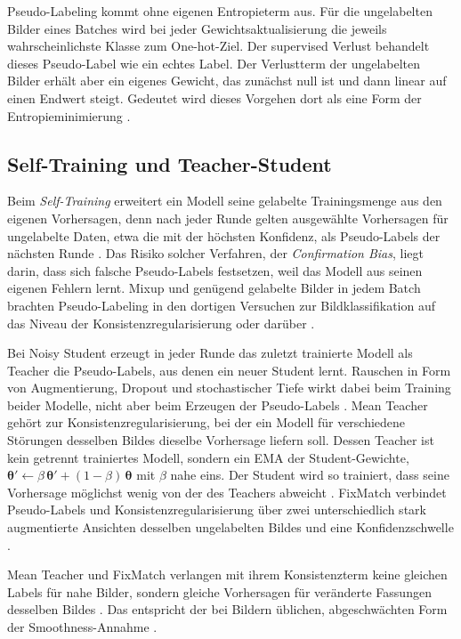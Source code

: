 Pseudo-Labeling kommt ohne eigenen Entropieterm aus. Für die ungelabelten Bilder eines Batches wird bei jeder Gewichtsaktualisierung die jeweils wahrscheinlichste Klasse zum One-hot-Ziel. Der supervised Verlust behandelt dieses Pseudo-Label wie ein echtes Label. Der Verlustterm der ungelabelten Bilder erhält aber ein eigenes Gewicht, das zunächst null ist und dann linear auf einen Endwert steigt. Gedeutet wird dieses Vorgehen dort als eine Form der Entropieminimierung \cite{lee_pseudo-label_2013}.

\subsection{Self-Training und Teacher-Student}
\label{sec:teacher-student}

Beim \emph{Self-Training} erweitert ein Modell seine gelabelte Trainingsmenge aus den eigenen Vorhersagen, denn nach jeder Runde gelten ausgewählte Vorhersagen für ungelabelte Daten, etwa die mit der höchsten Konfidenz, als Pseudo-Labels der nächsten Runde \cite{yarowsky_unsupervised_1995, van_engelen_survey_2019}. Das Risiko solcher Verfahren, der \emph{Confirmation Bias}, liegt darin, dass sich falsche Pseudo-Labels festsetzen, weil das Modell aus seinen eigenen Fehlern lernt. Mixup und genügend gelabelte Bilder in jedem Batch brachten Pseudo-Labeling in den dortigen Versuchen zur Bildklassifikation auf das Niveau der Konsistenzregularisierung oder darüber \cite{arazo_2020}.

Bei Noisy Student erzeugt in jeder Runde das zuletzt trainierte Modell als Teacher die Pseudo-Labels, aus denen ein neuer Student lernt. Rauschen in Form von Augmentierung, Dropout und stochastischer Tiefe wirkt dabei beim Training beider Modelle, nicht aber beim Erzeugen der Pseudo-Labels \cite{xie_self-training_2019}. Mean Teacher gehört zur Konsistenzregularisierung, bei der ein Modell für verschiedene Störungen desselben Bildes dieselbe Vorhersage liefern soll. Dessen Teacher ist kein getrennt trainiertes Modell, sondern ein \ac{EMA} der Student-Gewichte, $\bm{\theta}'\leftarrow\beta\,\bm{\theta}'+(1-\beta)\,\bm{\theta}$ mit $\beta$ nahe eins. Der Student wird so trainiert, dass seine Vorhersage möglichst wenig von der des Teachers abweicht \cite{tarvainen_weight-averaged_2017}. FixMatch verbindet Pseudo-Labels und Konsistenzregularisierung über zwei unterschiedlich stark augmentierte Ansichten desselben ungelabelten Bildes und eine Konfidenzschwelle \cite{sohn_fixmatch_2020}.

Mean Teacher und FixMatch verlangen mit ihrem Konsistenzterm keine gleichen Labels für nahe Bilder, sondern gleiche Vorhersagen für veränderte Fassungen desselben Bildes \cite{tarvainen_weight-averaged_2017, sohn_fixmatch_2020}. Das entspricht der bei Bildern üblichen, abgeschwächten Form der Smoothness-Annahme \cite{van_engelen_survey_2019}. 

